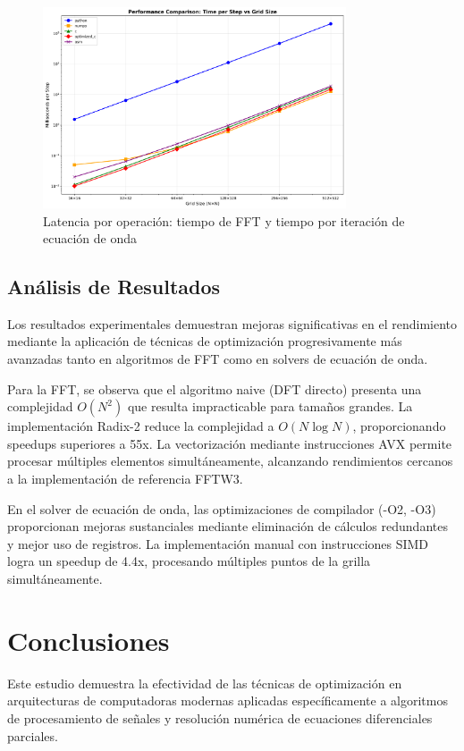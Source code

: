 \documentclass[a4paper]{article}
\begin{document}
\begin{figure}[h]
\centering
\includegraphics[width=0.8\textwidth]{../results/milliseconds_per_step.png}
\caption{Latencia por operación: tiempo de FFT y tiempo por iteración de ecuación de onda}
\label{fig:latency}
\end{figure}

\subsection{Análisis de Resultados}

Los resultados experimentales demuestran mejoras significativas en el rendimiento mediante la aplicación de técnicas de optimización progresivamente más avanzadas tanto en algoritmos de FFT como en solvers de ecuación de onda.

Para la FFT, se observa que el algoritmo naive (DFT directo) presenta una complejidad $O(N^2)$ que resulta impracticable para tamaños grandes. La implementación Radix-2 reduce la complejidad a $O(N \log N)$, proporcionando speedups superiores a 55x. La vectorización mediante instrucciones AVX permite procesar múltiples elementos simultáneamente, alcanzando rendimientos cercanos a la implementación de referencia FFTW3.

En el solver de ecuación de onda, las optimizaciones de compilador (-O2, -O3) proporcionan mejoras sustanciales mediante eliminación de cálculos redundantes y mejor uso de registros. La implementación manual con instrucciones SIMD logra un speedup de 4.4x, procesando múltiples puntos de la grilla simultáneamente.

\section{Conclusiones}

Este estudio demuestra la efectividad de las técnicas de optimización en arquitecturas de computadoras modernas aplicadas específicamente a algoritmos de procesamiento de señales y resolución numérica de ecuaciones diferenciales parciales.
\end{document}
